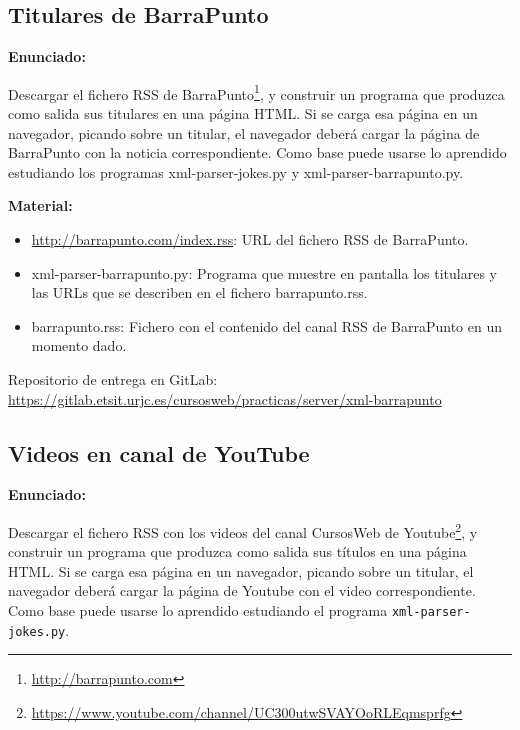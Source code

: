 \subsection{Titulares de BarraPunto}
\label{subsec:xml-barrapunto}

\textbf{Enunciado:}

Descargar el fichero RSS de BarraPunto\footnote{\url{http://barrapunto.com}}, y construir un programa que produzca como salida sus titulares en una página HTML. Si se carga esa página en un navegador,  picando sobre un titular, el navegador deberá cargar la página de BarraPunto con la noticia correspondiente. Como base puede usarse lo aprendido estudiando los programas xml-parser-jokes.py y xml-parser-barrapunto.py.

\textbf{Material:}

\begin{itemize}
\item \url{http://barrapunto.com/index.rss}: URL del fichero RSS de BarraPunto.
\item xml-parser-barrapunto.py: Programa que muestre en pantalla los titulares y las URLs que se describen en el fichero barrapunto.rss.
\item barrapunto.rss: Fichero con el contenido del canal RSS de BarraPunto en un momento dado.
\end{itemize}

Repositorio de entrega en GitLab: \\
\url{https://gitlab.etsit.urjc.es/cursosweb/practicas/server/xml-barrapunto}


\subsection{Videos en canal de YouTube}
\label{subsec:xml-youtube}

\textbf{Enunciado:}

Descargar el fichero RSS con los videos del canal CursosWeb de Youtube\footnote{\url{https://www.youtube.com/channel/UC300utwSVAYOoRLEqmsprfg}}, y construir un programa que produzca como salida sus títulos en una página HTML. Si se carga esa página en un navegador,  picando sobre un titular, el navegador deberá cargar la página de Youtube con el video correspondiente. Como base puede usarse lo aprendido estudiando el programa \verb|xml-parser-jokes.py|.

